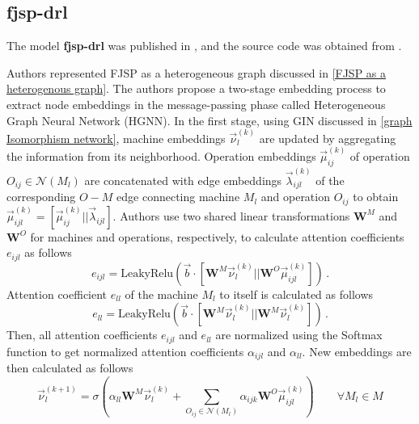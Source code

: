 \subsection{fjsp-drl}

The model \textbf{fjsp-drl} was published in \cite{9826438}, and the source code was obtained from \cite{github_fjsp_drl}.
\par
Authors represented FJSP as a heterogeneous graph discussed in \ref{FJSP as a heterogenous graph}. The authors propose a two-stage embedding process to extract node embeddings in the message-passing phase called Heterogeneous Graph Neural Network (HGNN). In the first stage, using GIN discussed in \ref{graph Isomorphism network}, machine embeddings $\vec{\nu}_l^{(k)}$ are updated by aggregating the information from its neighborhood. Operation embeddings $\vec{\mu}_{ij}^{(k)}$ of operation $O_{ij} \in \mathcal{N}(M_l)$ are concatenated with edge embeddings $\vec{\lambda}_{ijl}^{(k)}$ of the corresponding $O-M$ edge connecting machine $M_l$ and operation $O_{ij}$ to obtain $\vec{\mu}_{ijl}^{(k)} = \left [ \vec{\mu}_{ij}^{(k)}||\vec{\lambda}_{ijl}\right ]$. Authors use two shared linear transformations $\boldsymbol{W}^M$ and $\boldsymbol{W}^O$ for machines and operations, respectively, to calculate attention coefficients $e_{ijl}$ as follows \cite{9826438}
\begin{equation}
    e_{ijl} = \text{LeakyRelu}\left (\vec{b} \cdot \left [ \boldsymbol{W}^M \vec{\nu}_l^{(k)} || \boldsymbol{W}^O \vec{\mu}_{ijl}^{(k)} \right ]\right ) \, .
\end{equation}
Attention coefficient $e_{ll}$ of the machine $M_l$ to itself is calculated as follows \cite{9826438}
\begin{equation}
    e_{ll} = \text{LeakyRelu}\left (\vec{b} \cdot \left [ \boldsymbol{W}^M \vec{\nu}_l^{(k)} || \boldsymbol{W}^M \vec{\nu}_l^{(k)} \right ]\right ) \, .
\end{equation}
Then, all attention coefficients $e_{ijl}$ and $e_{ll}$ are normalized using the Softmax function to get normalized attention coefficients $\alpha_{ijl}$ and $\alpha_{ll}$. New embeddings are then calculated as follows \cite{9826438}
\begin{equation}
    \vec{\nu}_l^{(k+1)} = \sigma \left ( \alpha_{ll} \boldsymbol{W}^M \vec{\nu}_l^{(k)} + \sum_{O_{ij} \in \mathcal{N}(M_l)} \alpha_{ijk} \boldsymbol{W}^O\vec{\mu}_{ijl}^{(k)}\right ) \hspace{2em} \forall M_l \in M
\end{equation}
\par
